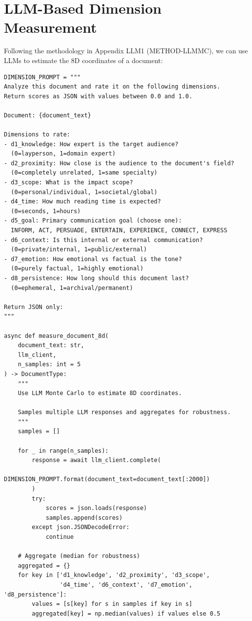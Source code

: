 \section{LLM-Based Dimension Measurement}
\label{sec:doctype-llm}

Following the methodology in Appendix LLM1 (METHOD-LLMMC), we can use LLMs
to estimate the 8D coordinates of a document:

\begin{verbatim}
DIMENSION_PROMPT = """
Analyze this document and rate it on the following dimensions.
Return scores as JSON with values between 0.0 and 1.0.

Document: {document_text}

Dimensions to rate:
- d1_knowledge: How expert is the target audience?
  (0=layperson, 1=domain expert)
- d2_proximity: How close is the audience to the document's field?
  (0=completely unrelated, 1=same specialty)
- d3_scope: What is the impact scope?
  (0=personal/individual, 1=societal/global)
- d4_time: How much reading time is expected?
  (0=seconds, 1=hours)
- d5_goal: Primary communication goal (choose one):
  INFORM, ACT, PERSUADE, ENTERTAIN, EXPERIENCE, CONNECT, EXPRESS
- d6_context: Is this internal or external communication?
  (0=private/internal, 1=public/external)
- d7_emotion: How emotional vs factual is the tone?
  (0=purely factual, 1=highly emotional)
- d8_persistence: How long should this document last?
  (0=ephemeral, 1=archival/permanent)

Return JSON only:
"""

async def measure_document_8d(
    document_text: str,
    llm_client,
    n_samples: int = 5
) -> DocumentType:
    """
    Use LLM Monte Carlo to estimate 8D coordinates.

    Samples multiple LLM responses and aggregates for robustness.
    """
    samples = []

    for _ in range(n_samples):
        response = await llm_client.complete(
            DIMENSION_PROMPT.format(document_text=document_text[:2000])
        )
        try:
            scores = json.loads(response)
            samples.append(scores)
        except json.JSONDecodeError:
            continue

    # Aggregate (median for robustness)
    aggregated = {}
    for key in ['d1_knowledge', 'd2_proximity', 'd3_scope',
                'd4_time', 'd6_context', 'd7_emotion', 'd8_persistence']:
        values = [s[key] for s in samples if key in s]
        aggregated[key] = np.median(values) if values else 0.5


\end{verbatim}
